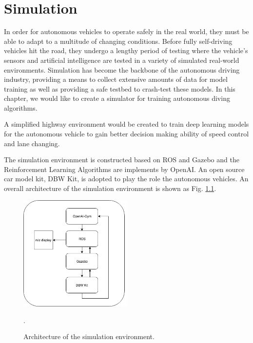 \chapter{Simulation} 

% 

In order for autonomous vehicles to operate safely in the real world, they must be able to adapt to a multitude of changing conditions. Before fully self-driving vehicles hit the road, they undergo a lengthy period of testing where the vehicle's sensors and artificial intelligence are tested in a variety of simulated real-world environments. Simulation has become the backbone of the autonomous driving industry, providing a means to collect extensive amounts of data for model training as well as providing a safe testbed to crash-test these models. In this chapter, we would like to create a simulator for training autonomous diving algorithms.

A simplified highway environment would be created to train deep learning models for the autonomous vehicle to gain better decision making ability of speed control and  lane changing.

The simulation environment is constructed based on ROS and Gazebo and the Reinforcement Learning Algorithms are implements by OpenAI. An open source car model kit, DBW Kit, is adopted to play the role the autonomous vehicles. An overall architecture of the simulation environment is shown as Fig. \ref{fig:sim-env}.

\begin{figure}[h]
\centering
\includegraphics[width=0.5\textwidth]{figs/ch2/simulation-architecture}
\caption{Architecture of the simulation environment.}
\label{fig:sim-env}.
\end{figure}



